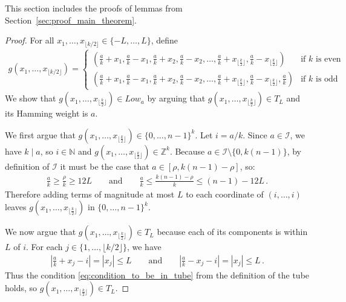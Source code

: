 \documentclass[11pt]{article}
\begin{document}
This section includes the proofs of lemmas from Section~\ref{sec:proof_main_theorem}.

\lemmasizelowa*
\begin{proof}
    For all $x_1, \ldots, x_{\lfloor k/2 \rfloor} \in \{-L, \ldots, L\}$, define %
    \begin{align}
        g(x_1, \ldots, x_{\lfloor k/2 \rfloor}) = \begin{cases}
            \left( \frac{a}{k} + x_1, \frac{a}{k} - x_1, \frac{a}{k} + x_2, \frac{a}{k} - x_2, \ldots, \frac{a}{k} + x_{\lfloor \frac{k}{2} \rfloor}, \frac{a}{k} - x_{\lfloor \frac{k}{2} \rfloor}\right) & \text{if $k$ is even} \\
            \left( \frac{a}{k} + x_1, \frac{a}{k} - x_1, \frac{a}{k} + x_2, \frac{a}{k} - x_2, \ldots, \frac{a}{k} + x_{\lfloor \frac{k}{2} \rfloor}, \frac{a}{k} - x_{\lfloor \frac{k}{2}\rfloor}, \frac{a}{k}\right) & \text{if $k$ is odd}
        \end{cases}
    \end{align}
    We show that $g(x_1, \ldots, x_{\lfloor \frac{k}{2}\rfloor}) \in Low_a$ by arguing that  $g(x_1, \ldots, x_{\lfloor \frac{k}{2}\rfloor}) \in T_L$ and its Hamming weight is $a$. 

    We first argue that $g(x_1, \ldots, x_{\lfloor \frac{k}{2} \rfloor}) \in \{0, \ldots, n-1\}^k$. Let $i = a/k$. Since $a \in \mathcal{I}$, we have $k \mid a$, so $i \in \mathbb{N}$ and $g(x_1, \ldots, x_{\lfloor \frac{k}{2} \rfloor}) \in \mathbb{Z}^k$. Because $a \in \mathcal{I} \setminus \{0, k(n-1)\}$, by definition of $\mathcal{I}$ it must be the case that $a \in [\rho, k(n-1)-\rho]$, so:
    \begin{align}
        \frac{a}{k} \geq \frac{\rho}{k} \geq 12L 
        \qquad \mbox{and} \qquad
        \frac{a}{k} \leq \frac{k(n-1)-\rho}{k} \leq (n-1) - 12L \,.
    \end{align}
    Therefore adding terms of magnitude at most $L$ to each coordinate of $(i, \ldots, i)$ leaves $g(x_1, \ldots, x_{\lfloor \frac{k}{2} \rfloor})$ in $\{0, \ldots, n-1\}^k$.
    
    We now argue that $g(x_1, \ldots, x_{\lfloor \frac{k}{2} \rfloor}) \in T_L$ because each of its components is within $L$ of $i$. For each $j \in \{1, \ldots, \lfloor k/2 \rfloor \}$, we have %
    \begin{align}
        \left| \frac{a}{k} + x_j - i \right| = |x_j| \leq L \qquad \mbox{and} \qquad  
        \left| \frac{a}{k} - x_j - i \right|  = |x_j| \leq L \,.
    \end{align}
    Thus the condition \eqref{eq:condition_to_be_in_tube} from the definition of the tube holds, so $g(x_1, \ldots, x_{\lfloor \frac{k}{2} \rfloor}) \in T_L$.
    

\end{proof}
\end{document}
